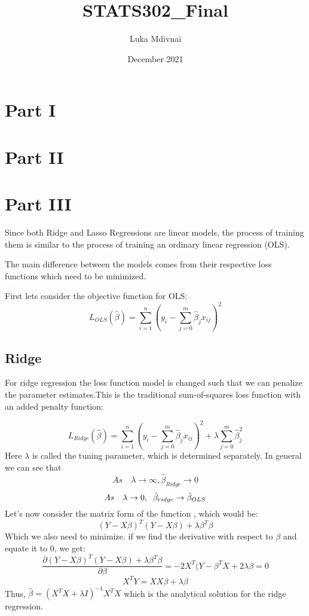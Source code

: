 \documentclass{article}
\title{STATS302\_Final}
\author{Luka Mdivnai}
\date{December 2021}
\begin{document}
\maketitle
\section*{Part I}

\section*{Part II}

\section*{Part III}

Since both Ridge and Lasso Regressions are linear models, the process of training them is similar to the process of training an ordinary linear regression (OLS).

The main difference between the models comes from their respective loss functions which need to be minimized.

First lets consider the objective function for OLS:
\begin{displaymath} 
L_{OLS}(\hat{\beta})=\sum_{i=1}^{n}{(y_i-\sum_{j=0}^{m}{\hat{\beta}_jx_{ij}})^2}
\end{displaymath}
\subsection*{Ridge}
For ridge regression the loss function model is changed such that we can penalize the parameter estimates.This is the traditional sum-of-squares loss function with an added penalty function:

\begin{displaymath} 
L_{Ridge}(\hat{\beta})=\sum_{i=1}^{n}{(y_i-\sum_{j=0}^{m}{\hat{\beta}_jx_{ij}})^2} + \lambda\sum_{j=0}^{m}{\hat{\beta}_j^2}
\end{displaymath}
Here $\lambda$ is called the tuning parameter, which is determined separately. In general we can see that $$As\quad\lambda\rightarrow\infty,\hat{\beta}_{Ridge}\rightarrow0$$ $$As\quad\lambda \rightarrow 0, \hspace{0.2cm}  \hat\beta_{ridge} \rightarrow \hat\beta_{OLS}$$
Let's now consider the matrix form of the function , which would be:
\begin{displaymath} 
(Y-X\beta)^T (Y-X\beta)+\lambda \beta^T \beta
\end{displaymath}
Which we also need to minimize. if we find the derivative with respect to $\beta$  and equate it to 0, we get:
\begin{displaymath} 
\frac{\partial (Y-X\beta)^T (Y-X\beta)+\lambda \beta^T \beta}{\partial \beta}= -2 X^T (Y-\beta^T X+2\lambda\beta =0
\end{displaymath}
\begin{displaymath} 
X^T Y=X X\beta +\lambda\beta  
\end{displaymath}
Thus,  $ \hat{\beta}=(X^{T}X+\lambda I)^{-1}X^TX $ which is the analytical solution for the ridge regression.
\end{document}
